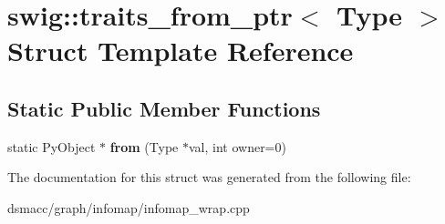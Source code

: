 \hypertarget{structswig_1_1traits__from__ptr}{}\section{swig\+:\+:traits\+\_\+from\+\_\+ptr$<$ Type $>$ Struct Template Reference}
\label{structswig_1_1traits__from__ptr}
\subsection*{Static Public Member Functions}
\begin{DoxyCompactItemize}
\item 
\mbox{\label{structswig_1_1traits__from__ptr_a02f758f7fd32a799a85cf3509940ff02}} 
static Py\+Object $\ast$ {\bfseries from} (Type $\ast$val, int owner=0)
\end{DoxyCompactItemize}


The documentation for this struct was generated from the following file\+:\begin{DoxyCompactItemize}
\item 
dsmacc/graph/infomap/infomap\+\_\+wrap.\+cpp\end{DoxyCompactItemize}
